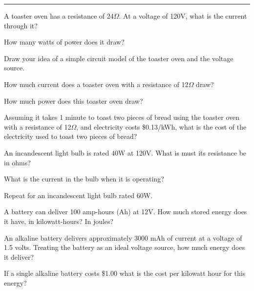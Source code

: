 \documentclass{article}
\begin{document}
\hrule
\vspace{10pt}






\subproblem
A toaster oven has a resistance of 24$\Omega$.  At a voltage of 120V,
what is the current through it?

\subproblem
How many watts of power does it draw?

\subproblem
Draw your idea of a simple circuit model of the toaster oven and the
voltage source.

\subproblem
How much current does a toaster oven with a resistance of
12$\Omega$ draw?

\subproblem
How much power does this toaster oven draw?

\subproblem
Assuming it takes 1 minute to toast two pieces of bread using the
toaster oven with a resistance of 12$\Omega$, and electricity costs
\$0.13/kWh, what is the cost of the electricity used to toast two
pieces of bread?




\subproblem
An incandescent light bulb is rated 40W at 120V.  What is must its
resistance be in ohms?

\subproblem
What is the current in the bulb when it is operating?

\subproblem
Repeat for an incandescent light bulb rated 60W.



\subproblem
A battery can deliver 100 amp-hours (Ah) at 12V.  How much stored
energy does it have, in kilowatt-hours?  In joules?

\subproblem
An alkaline battery delivers approximately 3000 mAh of current at a
voltage of 1.5 volts.  Treating the battery as an ideal voltage source,
how much energy does it deliver?


\subproblem
If a single alkaline battery costs \$1.00 what is the cost per kilowatt
hour for this energy?

\end{document}
